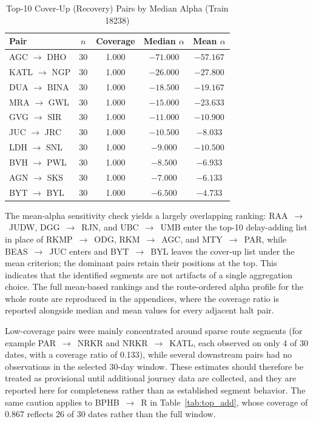 \documentclass[conference]{IEEEtran}
\begin{document}
\begin{table}[!t]
\centering
\caption{Top-10 Cover-Up (Recovery) Pairs by Median Alpha (Train 18238)}
\label{tab:top_cover}
\footnotesize
\setlength{\tabcolsep}{4.5pt}
\begin{tabular}{@{}lcccc@{}}
\toprule
Pair & $n$ & Coverage & Median $\alpha$ & Mean $\alpha$ \\
\midrule
AGC $\rightarrow$ DHO & 30 & 1.000 & $-71.000$ & $-57.167$ \\
KATL $\rightarrow$ NGP & 30 & 1.000 & $-26.000$ & $-27.800$ \\
DUA $\rightarrow$ BINA & 30 & 1.000 & $-18.500$ & $-19.167$ \\
MRA $\rightarrow$ GWL & 30 & 1.000 & $-15.000$ & $-23.633$ \\
GVG $\rightarrow$ SIR & 30 & 1.000 & $-11.000$ & $-10.900$ \\
JUC $\rightarrow$ JRC & 30 & 1.000 & $-10.500$ & $-8.033$ \\
LDH $\rightarrow$ SNL & 30 & 1.000 & $-9.000$ & $-10.500$ \\
BVH $\rightarrow$ PWL & 30 & 1.000 & $-8.500$ & $-6.933$ \\
AGN $\rightarrow$ SKS & 30 & 1.000 & $-7.000$ & $-6.133$ \\
BYT $\rightarrow$ BYL & 30 & 1.000 & $-6.500$ & $-4.733$ \\
\bottomrule
\end{tabular}
\end{table}

The mean-alpha sensitivity check yields a largely overlapping ranking: RAA~$\rightarrow$~JUDW, DGG~$\rightarrow$~RJN, and UBC~$\rightarrow$~UMB enter the top-10 delay-adding list in place of RKMP~$\rightarrow$~ODG, RKM~$\rightarrow$~AGC, and MTY~$\rightarrow$~PAR, while BEAS~$\rightarrow$~JUC enters and BYT~$\rightarrow$~BYL leaves the cover-up list under the mean criterion; the dominant pairs retain their positions at the top. This indicates that the identified segments are not artifacts of a single aggregation choice. The full mean-based rankings and the route-ordered alpha profile for the whole route are reproduced in the appendices, where the coverage ratio is reported alongside median and mean values for every adjacent halt pair.

Low-coverage pairs were mainly concentrated around sparse route segments (for example PAR~$\rightarrow$~NRKR and NRKR~$\rightarrow$~KATL, each observed on only 4 of 30 dates, with a coverage ratio of 0.133), while several downstream pairs had no observations in the selected 30-day window. These estimates should therefore be treated as provisional until additional journey data are collected, and they are reported here for completeness rather than as established segment behavior. The same caution applies to BPHB~$\rightarrow$~R in Table~\ref{tab:top_add}, whose coverage of 0.867 reflects 26 of 30 dates rather than the full window.
\end{document}
